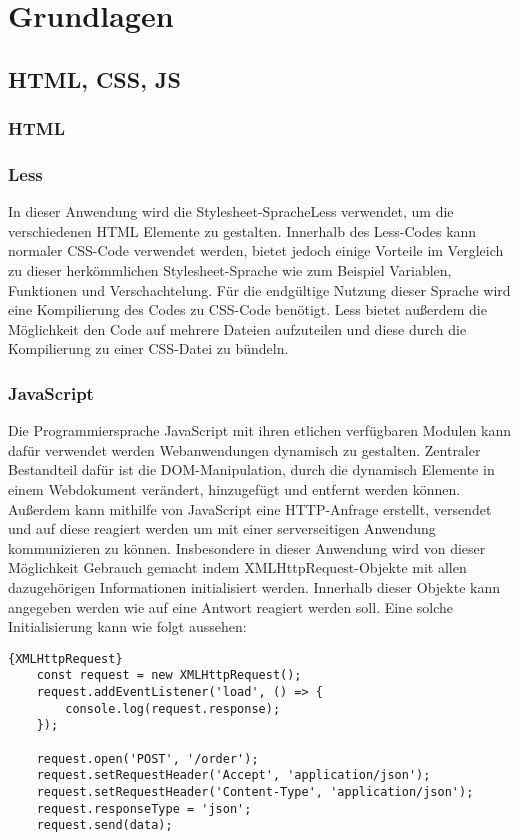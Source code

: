 \chapter{Grundlagen}

\section{HTML, CSS, JS}
\subsection{HTML}
\subsection{Less}
In dieser Anwendung wird die \glqq Stylesheet-Sprache\grqq \thinspace Less verwendet, um die verschiedenen HTML Elemente zu gestalten. Innerhalb des Less-Codes kann normaler CSS-Code verwendet werden, bietet jedoch einige Vorteile im Vergleich zu dieser herkömmlichen Stylesheet-Sprache wie zum Beispiel Variablen, Funktionen und Verschachtelung. Für die endgültige Nutzung dieser Sprache wird eine Kompilierung des Codes zu CSS-Code benötigt. Less bietet außerdem die Möglichkeit den Code auf mehrere Dateien aufzuteilen und diese durch die Kompilierung zu einer CSS-Datei zu bündeln.

\subsection{JavaScript}
Die Programmiersprache JavaScript mit ihren etlichen verfügbaren Modulen kann dafür verwendet werden Webanwendungen dynamisch zu gestalten. Zentraler Bestandteil dafür ist die \glqq DOM-Manipulation\grqq , durch die dynamisch Elemente in einem Webdokument verändert, hinzugefügt und entfernt werden können. Außerdem kann mithilfe von JavaScript eine HTTP-Anfrage erstellt, versendet und auf diese reagiert werden um mit einer serverseitigen Anwendung kommunizieren zu können. Insbesondere in dieser Anwendung wird von dieser Möglichkeit Gebrauch gemacht indem \glqq XMLHttpRequest\grqq-Objekte mit allen dazugehörigen Informationen initialisiert werden. Innerhalb dieser Objekte kann angegeben werden wie auf eine Antwort reagiert werden soll. Eine solche Initialisierung kann wie folgt aussehen:

\begin{lstlisting}{XMLHttpRequest}
	const request = new XMLHttpRequest();
	request.addEventListener('load', () => {
		console.log(request.response);
	});

    request.open('POST', '/order');
    request.setRequestHeader('Accept', 'application/json');
    request.setRequestHeader('Content-Type', 'application/json');
    request.responseType = 'json';
    request.send(data);
\end{lstlisting}


